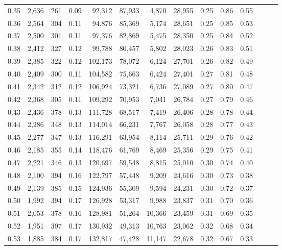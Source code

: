 \begin{tabular}{rrrrrrrrrrrrrr}
0.35 &  2,636 &  261 &  0.09 &   92,312 &   87,933 &   4,870 &  28,955 &  0.25 &  0.86 &      0.55 \\
0.36 &  2,564 &  304 &  0.11 &   94,876 &   85,369 &   5,174 &  28,651 &  0.25 &  0.85 &      0.53 \\
0.37 &  2,500 &  301 &  0.11 &   97,376 &   82,869 &   5,475 &  28,350 &  0.25 &  0.84 &      0.52 \\
0.38 &  2,412 &  327 &  0.12 &   99,788 &   80,457 &   5,802 &  28,023 &  0.26 &  0.83 &      0.51 \\
0.39 &  2,385 &  322 &  0.12 &  102,173 &   78,072 &   6,124 &  27,701 &  0.26 &  0.82 &      0.49 \\
0.40 &  2,409 &  300 &  0.11 &  104,582 &   75,663 &   6,424 &  27,401 &  0.27 &  0.81 &      0.48 \\
0.41 &  2,342 &  312 &  0.12 &  106,924 &   73,321 &   6,736 &  27,089 &  0.27 &  0.80 &      0.47 \\
0.42 &  2,368 &  305 &  0.11 &  109,292 &   70,953 &   7,041 &  26,784 &  0.27 &  0.79 &      0.46 \\
0.43 &  2,436 &  378 &  0.13 &  111,728 &   68,517 &   7,419 &  26,406 &  0.28 &  0.78 &      0.44 \\
0.44 &  2,286 &  348 &  0.13 &  114,014 &   66,231 &   7,767 &  26,058 &  0.28 &  0.77 &      0.43 \\
0.45 &  2,277 &  347 &  0.13 &  116,291 &   63,954 &   8,114 &  25,711 &  0.29 &  0.76 &      0.42 \\
0.46 &  2,185 &  355 &  0.14 &  118,476 &   61,769 &   8,469 &  25,356 &  0.29 &  0.75 &      0.41 \\
0.47 &  2,221 &  346 &  0.13 &  120,697 &   59,548 &   8,815 &  25,010 &  0.30 &  0.74 &      0.40 \\
0.48 &  2,100 &  394 &  0.16 &  122,797 &   57,448 &   9,209 &  24,616 &  0.30 &  0.73 &      0.38 \\
0.49 &  2,139 &  385 &  0.15 &  124,936 &   55,309 &   9,594 &  24,231 &  0.30 &  0.72 &      0.37 \\
0.50 &  1,992 &  394 &  0.17 &  126,928 &   53,317 &   9,988 &  23,837 &  0.31 &  0.70 &      0.36 \\
0.51 &  2,053 &  378 &  0.16 &  128,981 &   51,264 &  10,366 &  23,459 &  0.31 &  0.69 &      0.35 \\
0.52 &  1,951 &  397 &  0.17 &  130,932 &   49,313 &  10,763 &  23,062 &  0.32 &  0.68 &      0.34 \\
0.53 &  1,885 &  384 &  0.17 &  132,817 &   47,428 &  11,147 &  22,678 &  0.32 &  0.67 &      0.33 \\

\end{tabular}
